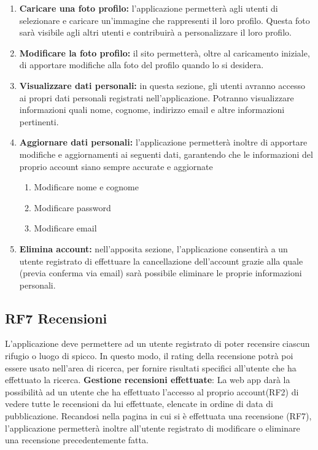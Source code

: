 \documentclass[a4paper,12pt]{article}
\begin{document}
\begin{enumerate} [leftmargin=40pt]
  \item \textbf{Caricare una foto profilo:} l'applicazione permetterà agli utenti di selezionare e caricare un'immagine che rappresenti il loro profilo. Questa foto sarà visibile agli altri utenti e contribuirà a personalizzare il loro profilo.

  \item \textbf{Modificare la foto profilo:} il sito permetterà, oltre al caricamento iniziale, di apportare modifiche alla foto del profilo quando lo si desidera. 

  

  \item \textbf{Visualizzare dati personali:} in questa sezione, gli utenti avranno accesso ai propri dati personali registrati nell'applicazione. Potranno visualizzare informazioni quali nome, cognome, indirizzo email e altre informazioni pertinenti.

  \item \textbf{Aggiornare dati personali:} l'applicazione permetterà inoltre di apportare modifiche e aggiornamenti ai seguenti dati, garantendo che le informazioni del proprio account siano sempre accurate e aggiornate
  
  \begin{enumerate} [leftmargin=40pt]
     \item Modificare nome e cognome
     \item Modificare password
     \item Modificare email
 \end{enumerate}

  \item \textbf{Elimina account:} nell’apposita sezione, l'applicazione consentirà a un utente registrato di effettuare la cancellazione dell'account grazie alla quale (previa conferma via email) sarà possibile eliminare le proprie informazioni personali.
\end{enumerate}


\subsection*{RF7 Recensioni}
L'applicazione deve permettere ad un utente registrato di poter recensire ciascun rifugio o luogo di spicco.\newline
In questo modo, il rating della recensione potrà poi essere usato nell'area di ricerca, per fornire risultati specifici all'utente che ha effettuato la ricerca. \newline\newline
\textbf{Gestione recensioni effettuate}: La web app darà la possibilità ad un utente che ha effettuato l'accesso al proprio account(RF2) di vedere tutte le recensioni da lui effettuate, elencate in ordine di data di pubblicazione.
Recandosi nella pagina in cui si è effettuata una recensione (RF7), l'applicazione permetterà inoltre all'utente registrato di modificare o eliminare una recensione precedentemente fatta.\newline
\end{document}
